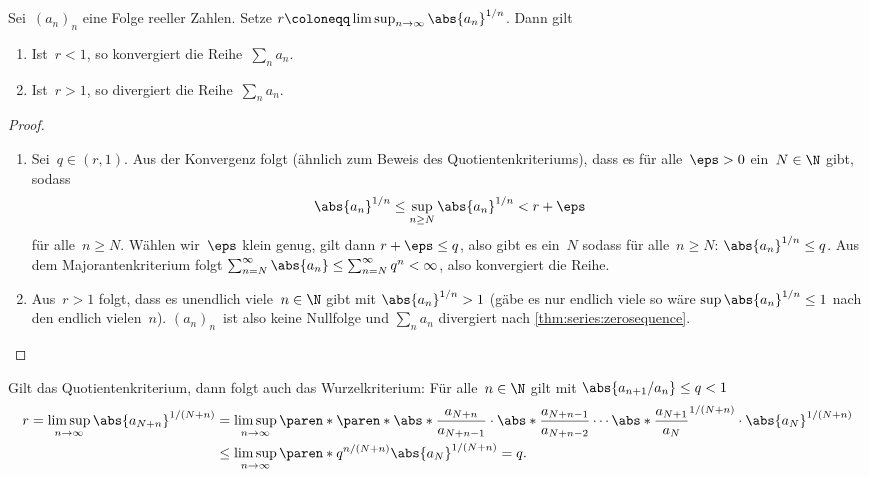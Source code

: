 \documentclass[a4paper]{article}
\begin{document}
\begin{theorem}[Wurzelkriterium]
    Sei~$(a_n)_n$ eine Folge reeller Zahlen. Setze $r \coloneqq \limsup_{n\to\infty} \abs{a_n}^{1/n}$. Dann gilt
    \begin{enumerate}
        \item Ist~$r < 1$, so konvergiert die Reihe~$\sum_n a_n$.
        \item Ist~$r > 1$, so divergiert die Reihe~$\sum_n a_n$.
    \end{enumerate}
\end{theorem}

\begin{proof}\leavevmode
    \begin{enumerate}
        \item Sei~$q \in (r, 1)$. Aus der Konvergenz folgt (ähnlich zum Beweis des Quotientenkriteriums), dass es für alle~$\eps > 0$ ein~$N \in \N$ gibt, sodass
              \begin{equation*}
                  \abs{a_n}^{1/n} \leq \sup_{n\geq N} \abs{a_n}^{1/n} < r+\eps
              \end{equation*}
              für alle~$n \geq N$. Wählen wir~$\eps$ klein genug, gilt dann $r+\eps \leq q$, also gibt es ein~$N$ sodass für alle~$n \geq N$: $\abs{a_n}^{1/n} \leq q$. Aus dem Majorantenkriterium folgt $\sum_{n=N}^\infty \abs{a_n} \leq \sum_{n=N}^\infty q^n < \infty$, also konvergiert die Reihe.
        \item Aus~$r > 1$ folgt, dass es unendlich viele~$n \in \N$ gibt mit $\abs{a_n}^{1/n} > 1$ (gäbe es nur endlich viele so wäre $\sup\abs{a_n}^{1/n} \leq 1$ nach den endlich vielen~$n$). $(a_n)_n$~ist also keine Nullfolge und $\sum_n a_n$ divergiert nach \cref{thm:series:zerosequence}.\qedhere
    \end{enumerate}
\end{proof}

\begin{remark}
    Gilt das Quotientenkriterium, dann folgt auch das Wurzelkriterium: Für alle~$n \in \N$ gilt mit $\abs{a_{n+1}/a_n} \leq q < 1$
    \begin{align*}
        r = \limsup_{n\to\infty} \abs{a_{N+n}}^{1/(N+n)} & = \limsup_{n\to\infty} \paren*{\paren*{ \abs*{\frac{a_{N+n}}{a_{N+n-1}}} \cdot \abs*{\frac{a_{N+n-1}}{a_{N+n-2}}} \cdots \abs*{\frac{a_{N+1}}{a_N}} }^{1/(N+n)} \cdot \abs{a_N}^{1/(N+n)}} \\
                                                         & \leq \limsup_{n\to\infty} \paren*{q^{n/(N+n)} \abs{a_N}^{1/(N+n)}} = q.
    \end{align*}
\end{remark}
\end{document}

